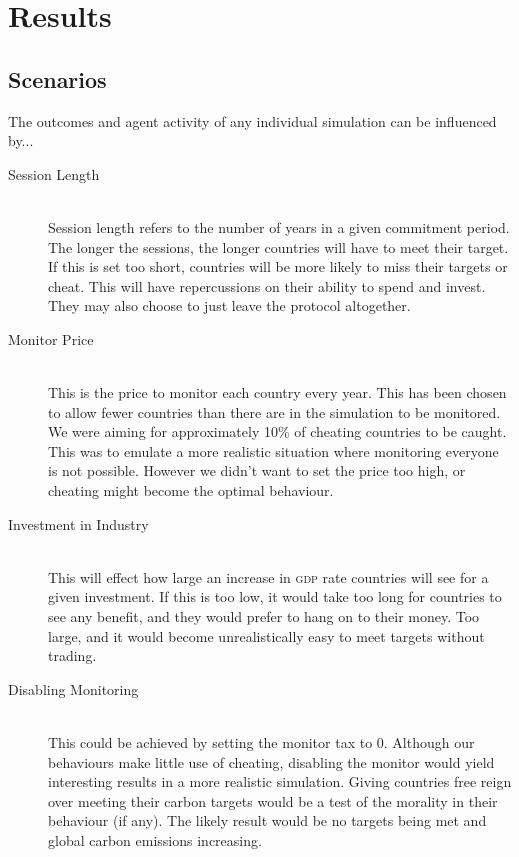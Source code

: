 \section{Results}

%
%

\subsection{Scenarios}

The outcomes and agent activity of any individual simulation can be influenced by... 

\begin{description}
\item[Session Length] \hfill \\

Session length refers to the number of years in a given commitment period. The longer the sessions, the longer countries will have to meet their target. If this is set too short, countries will be more likely to miss their targets or cheat. This will have repercussions on their ability to spend and invest. They may also choose to just leave the protocol altogether.

\item[Monitor Price] \hfill \\

This is the price to monitor each country every year. This has been chosen to allow fewer countries than there are in the simulation to be monitored. We were aiming for approximately 10\% of cheating countries to be caught. This was to emulate a more realistic situation where monitoring everyone is not possible. However we didn't want to set the price too high, or cheating might become the optimal behaviour.

\item[Investment in Industry] \hfill \\

This will effect how large an increase in \textsc{gdp} rate countries will see for a given investment. If this is too low, it would take too long for countries to see any benefit, and they would prefer to hang on to their money. Too large, and it would become unrealistically easy to meet targets without trading.

\item[Disabling Monitoring] \hfill \\

This could be achieved by setting the monitor tax to 0. Although our behaviours make little use of cheating, disabling the monitor would yield interesting results in a more realistic simulation. Giving countries free reign over meeting their carbon targets would be a test of the morality in their behaviour (if any). The likely result would be no targets being met and global carbon emissions increasing.


\end{description}
